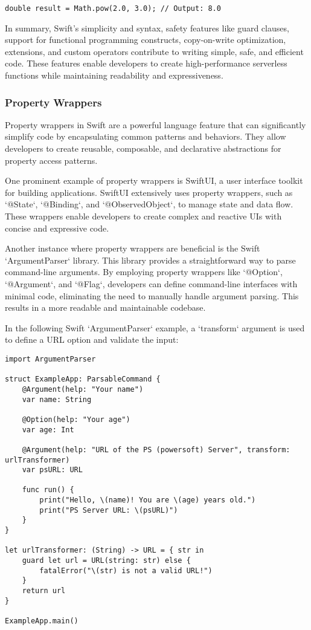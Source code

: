 \begin{verbatim}
double result = Math.pow(2.0, 3.0); // Output: 8.0
\end{verbatim}

In summary, Swift's simplicity and syntax, safety features like guard clauses, support for functional programming constructs, copy-on-write optimization, extensions, and custom operators contribute to writing simple, safe, and efficient code. These features enable developers to create high-performance serverless functions while maintaining readability and expressiveness.

\subsubsection{Property Wrappers}
Property wrappers in Swift are a powerful language feature that can significantly simplify code by encapsulating common patterns and behaviors. They allow developers to create reusable, composable, and declarative abstractions for property access patterns.

One prominent example of property wrappers is SwiftUI, a user interface toolkit for building applications. SwiftUI extensively uses property wrappers, such as `@State`, `@Binding`, and `@ObservedObject`, to manage state and data flow. These wrappers enable developers to create complex and reactive UIs with concise and expressive code.

Another instance where property wrappers are beneficial is the Swift `ArgumentParser` library. This library provides a straightforward way to parse command-line arguments. By employing property wrappers like `@Option`, `@Argument`, and `@Flag`, developers can define command-line interfaces with minimal code, eliminating the need to manually handle argument parsing. This results in a more readable and maintainable codebase.

In the following Swift `ArgumentParser` example, a `transform` argument is used to define a URL option and validate the input:

\begin{verbatim}
import ArgumentParser

struct ExampleApp: ParsableCommand {
    @Argument(help: "Your name")
    var name: String

    @Option(help: "Your age")
    var age: Int

    @Argument(help: "URL of the PS (powersoft) Server", transform: urlTransformer)
    var psURL: URL

    func run() {
        print("Hello, \(name)! You are \(age) years old.")
        print("PS Server URL: \(psURL)")
    }
}

let urlTransformer: (String) -> URL = { str in
    guard let url = URL(string: str) else {
        fatalError("\(str) is not a valid URL!")
    }
    return url
}

ExampleApp.main()
\end{verbatim}

